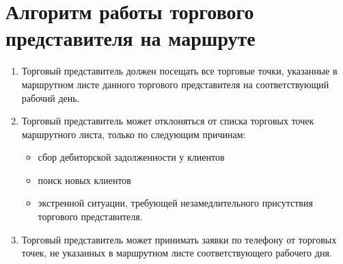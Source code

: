 \section{Алгоритм работы торгового представителя на маршруте}
\begin{enumerate}[\thesection .1]
\item Торговый представитель должен посещать все торговые точки, указанные в маршрутном листе данного торгового представителя на соответствующий рабочий день.
\item Торговый представитель может отклоняться от списка торговых точек маршрутного листа, только по следующим причинам:
\begin{itemize}[topsep=0pt, itemsep=-0.5ex]
	\item сбор дебиторской задолженности у клиентов
	\item поиск новых клиентов
	\item экстренной ситуации, требующей незамедлительного присутствия торгового представителя.
\end{itemize}
\item Торговый представитель может принимать заявки по телефону от торговых точек, не указанных в маршрутном листе соответствующего рабочего дня.
\end{enumerate}